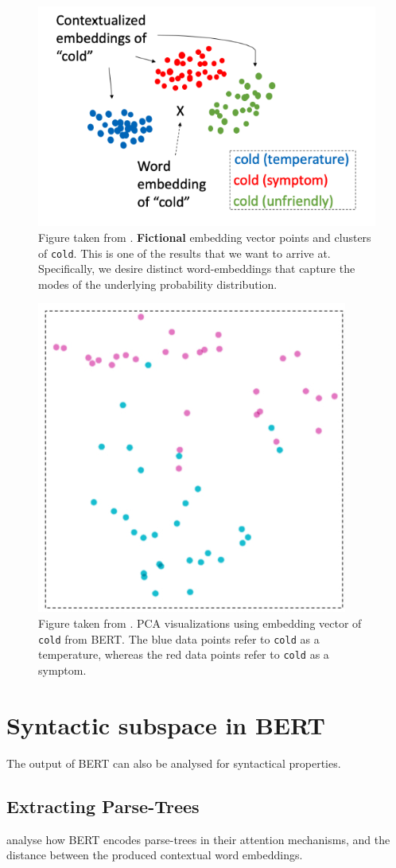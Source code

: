 \documentclass[a4paper,12pt,oneside,openright]{report}
\begin{document}
\begin{figure}[H]
	\center
  \includegraphics[width=0.4\linewidth]{./assets/relatedwork/cold_fictional_desired.png}
  \caption{Figure taken from \cite{si19}. \textbf{Fictional} embedding vector points and clusters of \texttt{cold}. This is one of the results that we want to arrive at.
  Specifically, we desire distinct word-embeddings that capture the modes of the underlying probability distribution. }
  \label{fig:cold_fictional_desired}
\end{figure}

\begin{figure}[H]
	\center
  \includegraphics[width=0.3\linewidth]{./assets/relatedwork/cold_biobert.png}
  \caption{Figure taken from \cite{si19}. PCA visualizations using embedding vector of \texttt{cold} from BERT. The blue data points refer to \texttt{cold} as a temperature, whereas the red data points refer to \texttt{cold} as a symptom.}
  \label{fig:cold_fictional_desired}
\end{figure}


\section{Syntactic subspace in BERT}

The output of BERT can also be analysed for syntactical properties.

\subsection{Extracting Parse-Trees}

\cite{coenen19, jawahar19} analyse how BERT encodes parse-trees in their attention mechanisms, and the distance between the produced contextual word embeddings. \\
\end{document}
